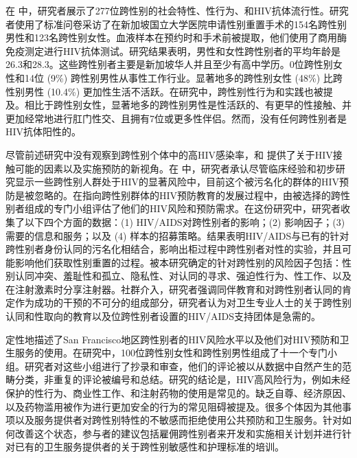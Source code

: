 \documentclass[5p]{elsarticle}
\begin{document}
在 \cite{chew1997}中，研究者展示了277位跨性别的社会特性、性行为、和HIV抗体流行性。研究者使用了标准问卷采访了在新加坡国立大学医院申请性别重置手术的154名跨性别男性和123名跨性别女性。血液样本在预约时和手术前被提取，他们使用了商用酶免疫测定进行HIV抗体测试。研究结果表明，男性和女性跨性别者的平均年龄是26.3和28.3。这些跨性别者主要是新加坡华人并且至少有高中学历。0位跨性别女性和14位 (9\%) 跨性别男性从事性工作行业。显著地多的跨性别女性 (48\%) 比跨性别男性 (10.4\%) 更加性生活不活跃。在研究中，跨性别性行为和实践也被提及。相比于跨性别女性，显著地多的跨性别男性是性活跃的、有更早的性接触、并更加经常地进行肛门性交、且拥有7位或更多性伴侣。然而，没有任何跨性别者是HIV抗体阳性的。

尽管前述研究中没有观察到跨性别个体中的高HIV感染率，\cite{bockting1998}和 \cite{clements1999}提供了关于HIV接触可能的因素以及实施预防的新视角。在 \cite{bockting1998}中，研究者承认尽管临床经验和初步研究显示一些跨性别人群处于HIV的显著风险中，目前这个被污名化的群体的HIV预防是被忽略的。在指向跨性别群体的HIV预防教育的发展过程中，由被选择的跨性别者组成的专门小组评估了他们的HIV风险和预防需求。在这份研究中，研究者收集了以下四个方面的数据：(1) HIV/AIDS对跨性别者的影响；(2) 影响因子；(3) 需要的信息和服务；以及 (4) 样本的招募策略。结果表明HIV/AIDS与已有的针对跨性别者身份认同的污名化相结合，影响出柜过程中跨性别者对性的实验，并且可能影响他们获取性别重置的过程。被本研究确定的针对跨性别的风险因子包括：性别认同冲突、羞耻性和孤立、隐私性、对认同的寻求、强迫性行为、性工作、以及在注射激素时分享注射器。社群介入，研究者强调同伴教育和对跨性别者认同的肯定作为成功的干预的不可分的组成部分，研究者认为对卫生专业人士的关于跨性别认同和性取向的教育以及位跨性别者设置的HIV/AIDS支持团体是急需的。

\cite{clements1999}定性地描述了San Francisco地区跨性别者的HIV风险水平以及他们对HIV预防和卫生服务的使用。在研究中，100位跨性别女性和跨性别男性组成了十一个专门小组。研究者对这些小组进行了抄录和审查，他们的评论被以从数据中自然产生的范畴分类，非重复的评论被编号和总结。研究的结论是，HIV高风险行为，例如未经保护的性行为、商业性工作、和注射药物的使用是常见的。缺乏自尊、经济原因、以及药物滥用被作为进行更加安全的行为的常见阻碍被提及。很多个体因为其他事项以及服务提供者对跨性别特性的不敏感而拒绝使用公共预防和卫生服务。针对如何改善这个状态，参与者的建议包括雇佣跨性别者来开发和实施相关计划并进行针对已有的卫生服务提供者的关于跨性别敏感性和护理标准的培训。
\end{document}
